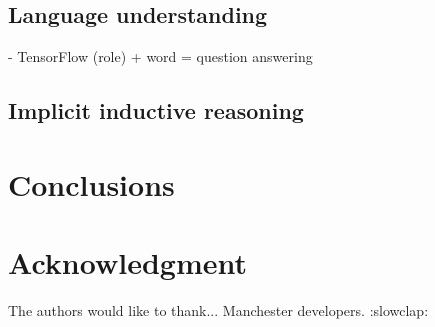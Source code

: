 \documentclass[conference]{IEEEtran}
\begin{document}
\subsection{Language understanding}
- TensorFlow (role) + word = question answering
\subsection{Implicit inductive reasoning}

\section{Conclusions}


\section*{Acknowledgment}

The authors would like to thank... Manchester developers. :slowclap:



 





\end{document}
